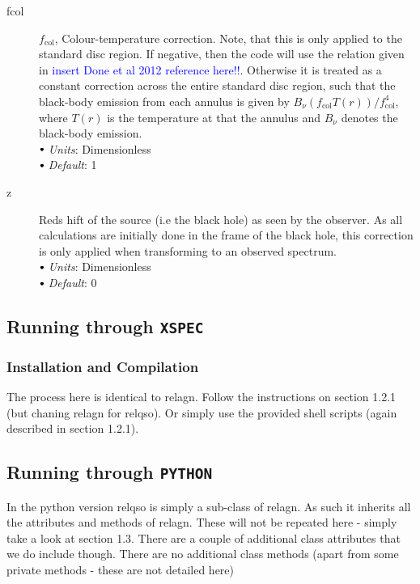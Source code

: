\documentclass[a4paper, 11pt, times, onecolumn]{article}
\newcommand{\fcol}{f_{\mathrm{col}}}
\newcommand{\sbt}{\,\begin{picture}(-1,1)(-1,-3)\circle*{3}\end{picture}\ }
\begin{document}
\begin{description}
	
	\item[fcol] $\fcol$, Colour-temperature correction. Note, that this is only applied to the standard disc region. If negative, then the code will use the relation given in \textcolor{blue}{insert Done et al 2012 reference here!!}. Otherwise it is treated as a constant correction across the entire standard disc region, such that the black-body emission from each annulus is given by $B_{\nu}(\fcol T(r))/\fcol^{4}$, where $T(r)$ is the temperature at that the annulus and $B_{\nu}$ denotes the black-body emission.\\
		$\sbt$ {\it Units}: Dimensionless \\
		$\sbt$ {\it Default}: 1 
	
	
	\item[z] Reds
hift of the source (i.e the black hole) as seen by the observer. As all calculations are initially done in the frame of the black hole, this correction is only applied when transforming to an observed spectrum. \\
		$\sbt$ {\it Units}: Dimensionless \\
		$\sbt$ {\it Default}: 0
		
\end{description}



\subsection{Running through {\tt XSPEC}}

\subsubsection{Installation and Compilation}

The process here is identical to {\sc relagn}. Follow the instructions on section 1.2.1 (but chaning {\sc relagn} for {\sc relqso}). Or simply use the provided shell scripts (again described in section 1.2.1).


\subsection{Running through {\tt PYTHON}}

In the {\sc python} version {\sc relqso} is simply a sub-class of {\sc relagn}. As such it inherits all the attributes and methods of {\sc relagn}. These will not be repeated here - simply take a look at section 1.3.
There are a couple of additional class attributes that we do include though.
There are no additional class methods (apart from some private methods - these are not detailed here)
\end{document}
